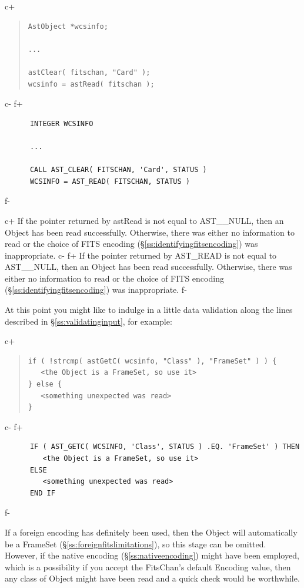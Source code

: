 \documentclass[twoside,11pt]{article}
\newcommand{\secref}[1]{\S\ref{#1}}
\newcommand{\secref}[1]{\ref{#1}}
\begin{document}
c+
\begin{quote}
\small
\begin{verbatim}
AstObject *wcsinfo;

...

astClear( fitschan, "Card" );
wcsinfo = astRead( fitschan );
\end{verbatim}
\normalsize
\end{quote}
c-
f+
\small
\begin{verbatim}
      INTEGER WCSINFO

      ...

      CALL AST_CLEAR( FITSCHAN, 'Card', STATUS )
      WCSINFO = AST_READ( FITSCHAN, STATUS )
\end{verbatim}
\normalsize
f-

c+
If the pointer returned by astRead is not equal to AST\_\_NULL, then
an Object has been read successfully. Otherwise, there was either no
information to read or the choice of FITS encoding
(\secref{ss:identifyingfitsencoding}) was inappropriate.
c-
f+
If the pointer returned by AST\_READ is not equal to AST\_\_NULL, then
an Object has been read successfully. Otherwise, there was either no
information to read or the choice of FITS encoding
(\secref{ss:identifyingfitsencoding}) was inappropriate.
f-

At this point you might like to indulge in a little data validation
along the lines described in \secref{ss:validatinginput}, for example:

c+
\begin{quote}
\small
\begin{verbatim}
if ( !strcmp( astGetC( wcsinfo, "Class" ), "FrameSet" ) ) {
   <the Object is a FrameSet, so use it>
} else {
   <something unexpected was read>
}
\end{verbatim}
\normalsize
\end{quote}
c-
f+
\small
\begin{verbatim}
      IF ( AST_GETC( WCSINFO, 'Class', STATUS ) .EQ. 'FrameSet' ) THEN
         <the Object is a FrameSet, so use it>
      ELSE
         <something unexpected was read>
      END IF
\end{verbatim}
\normalsize
f-

If a foreign encoding has definitely been used, then the Object will
automatically be a FrameSet (\secref{ss:foreignfitslimitations}), so
this stage can be omitted. However, if the native encoding
(\secref{ss:nativeencoding}) might have been employed, which is a
possibility if you accept the FitsChan's default Encoding value, then
any class of Object might have been read and a quick check would be
worthwhile.
\end{document}
